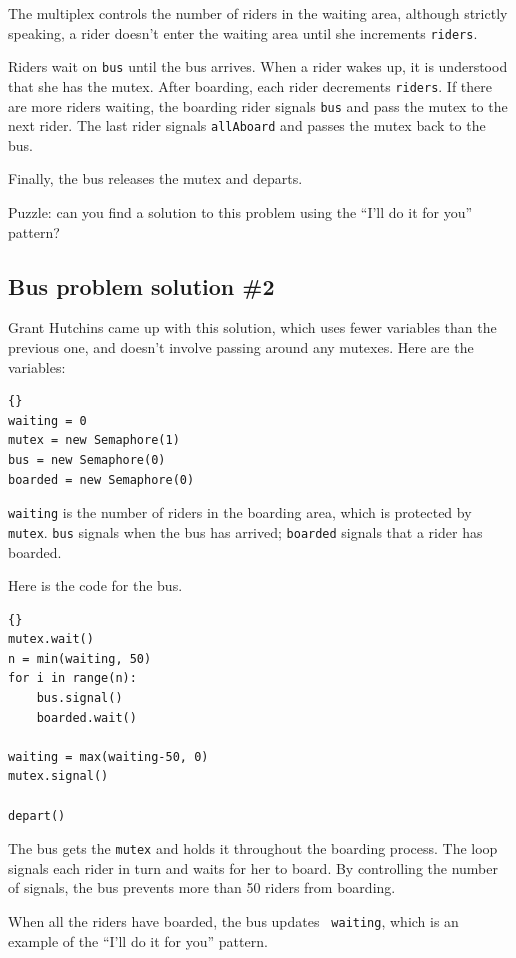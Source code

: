 \documentclass{book}
\newcommand{\clearemptydoublepage}{\newpage\cleardoublepage}
\begin{document}
The multiplex controls the number of riders in the waiting area,
although strictly speaking, a rider doesn't enter the waiting
area until she increments {\tt riders}.

Riders wait on {\tt bus} until the bus arrives.  When a rider
wakes up, it is understood that she has the mutex.
After boarding, each rider decrements {\tt riders}.  If there
are more riders waiting, the boarding rider signals {\tt bus}
and pass the mutex to the next rider.  The last rider signals
{\tt allAboard} and passes the mutex back to the bus.

Finally, the bus releases the mutex and departs.

Puzzle: can you find a solution to this problem using the
``I'll do it for you'' pattern?


\clearemptydoublepage
\subsection {Bus problem solution \#2}

Grant Hutchins came up with this solution, which uses fewer
variables than the previous one, and doesn't involve passing
around any mutexes.  Here are the variables:

\begin{lstlisting}[caption={Bus problem solution \#2 (initialization)}]{}
waiting = 0
mutex = new Semaphore(1)
bus = new Semaphore(0)
boarded = new Semaphore(0)
\end{lstlisting}

{\tt waiting} is the number of riders in the boarding area,
which is protected by {\tt mutex}.  {\tt bus} signals when the
bus has arrived; {\tt boarded} signals that a rider has boarded.

Here is the code for the bus.

\begin{lstlisting}[caption={Bus problem solution (bus)}]{}
mutex.wait()
n = min(waiting, 50)
for i in range(n):
    bus.signal()
    boarded.wait()

waiting = max(waiting-50, 0)
mutex.signal()

depart()
\end{lstlisting}

The bus gets the {\tt mutex} and holds it throughout the boarding
process.  The loop signals each rider in turn and waits for her to
board.  By controlling the number of signals, the bus prevents
more than 50 riders from boarding.

When all the riders have boarded, the bus updates {\tt
waiting}, which is an example of the ``I'll do it for you'' pattern.
\end{document}
